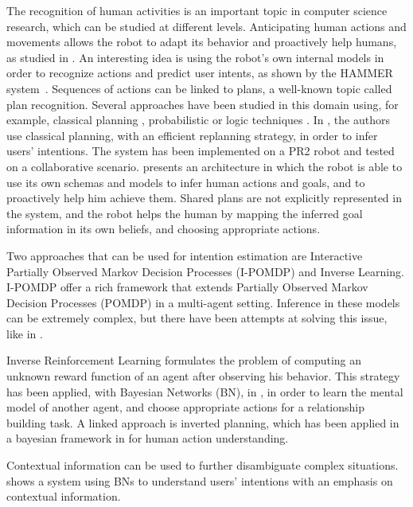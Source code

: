 The recognition of human activities is an important topic in computer science research, which can be studied at different levels. Anticipating human actions and movements allows the robot to adapt its behavior and proactively help humans, as studied in \cite{koppula2013anticipating}. An interesting idea is using the robot's own internal models in order to recognize actions and predict user intents, as shown by the HAMMER system~\cite{demiris2007prediction}. Sequences of actions can be linked to plans, a well-known topic called plan recognition. Several approaches have been studied in this domain using, for example, classical planning \cite{ramirez2009plan}, probabilistic \cite{bui2003general} or logic techniques \cite{singla2011abductive}.  In \cite{talamadupula2014coordination}, the authors use classical planning, with an efficient replanning strategy, in order to infer users' intentions. The system has been implemented on a PR2 robot and tested on a collaborative scenario. \cite{breazeal2009embodied} presents an architecture in which the robot is able to use its own schemas and models to infer human actions and goals, and to proactively help him achieve them. Shared plans are not explicitly represented in the system, and the robot helps the human by mapping the inferred goal information in its own beliefs, and choosing appropriate actions.

Two approaches that can be used for intention estimation are Interactive Partially Observed Markov Decision Processes (I-POMDP) and Inverse Learning. I-POMDP  \cite{gmytrasiewicz2004interactive} offer a rich framework that extends Partially Observed Markov Decision Processes (POMDP) in a multi-agent setting. Inference in these models can be extremely complex, but there have been attempts at solving this issue, like in \cite{doshi2009monte,hoang2013interactive}. 

Inverse Reinforcement Learning \cite{ng2000algorithms} formulates the problem of computing an unknown reward function of an agent after observing his behavior. This strategy has been applied, with Bayesian Networks (BN), in \cite{Nagai2015}, in order to learn the mental model of another agent, and choose appropriate actions for a relationship building task. A linked approach is inverted planning, which has been applied in a bayesian framework in \cite{baker2009action}  for human action understanding.

Contextual information can be used to further disambiguate complex situations. \cite{Liu2014} shows a system using BNs to understand users' intentions with an emphasis on contextual information.

